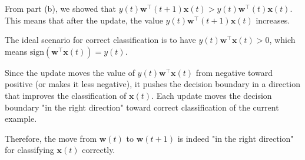 \begin{itemize}
From part (b), we showed that $y(t)\mathbf{w}^\top(t+1)\mathbf{x}(t) > y(t)\mathbf{w}^\top(t)\mathbf{x}(t)$. This means that after the update, the value $y(t)\mathbf{w}^\top(t+1)\mathbf{x}(t)$ increases.

The ideal scenario for correct classification is to have $y(t)\mathbf{w}^\top\mathbf{x}(t) > 0$, which means $\text{sign}(\mathbf{w}^\top\mathbf{x}(t)) = y(t)$. 

Since the update moves the value of $y(t)\mathbf{w}^\top\mathbf{x}(t)$ from negative toward positive (or makes it less negative), it pushes the decision boundary in a direction that improves the classification of $\mathbf{x}(t)$. Each update moves the decision boundary "in the right direction" toward correct classification of the current example.

Therefore, the move from $\mathbf{w}(t)$ to $\mathbf{w}(t+1)$ is indeed "in the right direction" for classifying $\mathbf{x}(t)$ correctly.
\end{itemize}









\newpage
